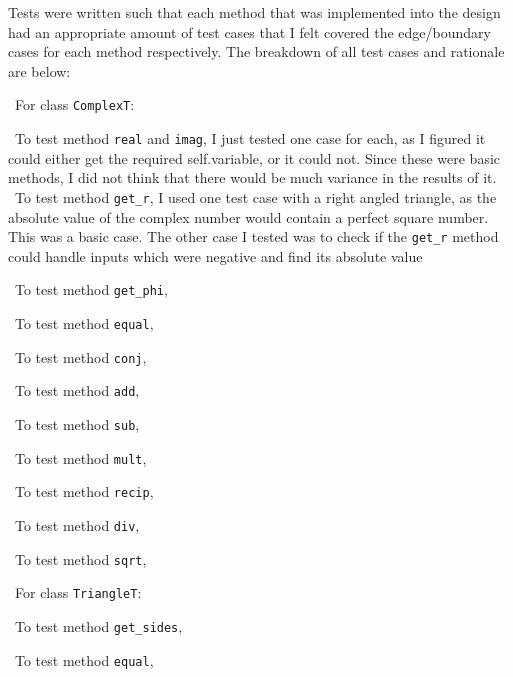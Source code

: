 \documentclass[12pt]{article}
\begin{document}
Tests were written such that each method that was implemented into the design
had an appropriate amount of test cases that I felt covered the edge/boundary 
cases for each method respectively. The breakdown of all test cases and 
rationale are below:

~\newline\noindent For class \verb|ComplexT|:

~\newline\noindent To test method \verb|real| and \verb|imag|, I just tested one case for each, 
as I figured it could either get the required self.variable, or it could not. 
Since these were basic methods, I did not think that there would be much variance 
in the results of it. 
~\newline\noindent To test method \verb|get_r|, I used one test case with a right angled triangle, as the absolute value of the complex number would contain a perfect square number. This was a basic case. The other case I tested was to check if the \verb|get_r| method could handle inputs which were negative and find its absolute value

~\newline\noindent To test method \verb|get_phi|,

~\newline\noindent To test method \verb|equal|,

~\newline\noindent To test method \verb|conj|,

~\newline\noindent To test method \verb|add|,

~\newline\noindent To test method \verb|sub|,

~\newline\noindent To test method \verb|mult|,

~\newline\noindent To test method \verb|recip|,

~\newline\noindent To test method \verb|div|,

~\newline\noindent To test method \verb|sqrt|,


~\newline\noindent For class \verb|TriangleT|:

~\newline\noident To test method \verb|get_sides|,

~\newline\noindent To test method \verb|equal|,
\end{document}
